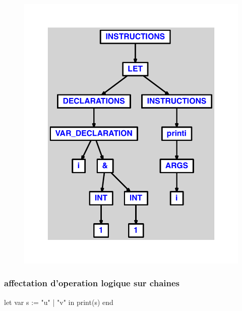 \documentclass{article}
\begin{document}
\begin{figure}[H]\centering\includegraphics[max width=\textwidth]{ast/ast_290.pdf}\end{figure}\subsubsection{affectation d'operation logique sur chaines}
\begin{verbatimtab}
let
	var s := "u" | "v"
in
	print(s)
end
\end{verbatimtab}
\end{document}
